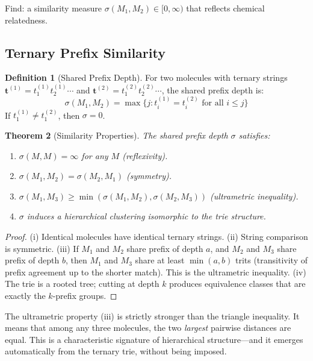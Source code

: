 \documentclass[11pt,twocolumn,a4paper]{article}
\newtheorem{theorem}{Theorem}[section]
\theoremstyle{definition}
\newtheorem{definition}[theorem]{Definition}
\theoremstyle{remark}
\begin{document}
Find: a similarity measure $\sigma(M_1, M_2) \in [0, \infty)$ that reflects chemical relatedness.

\subsection{Ternary Prefix Similarity}

\begin{definition}[Shared Prefix Depth]
\label{def:spd}
For two molecules with ternary strings $\mathbf{t}^{(1)} = t_1^{(1)} t_2^{(1)} \cdots$ and $\mathbf{t}^{(2)} = t_1^{(2)} t_2^{(2)} \cdots$, the shared prefix depth is:
\begin{equation}
\sigma(M_1, M_2) = \max\{j : t_i^{(1)} = t_i^{(2)} \text{ for all } i \leq j\}
\label{eq:spd}
\end{equation}
If $t_1^{(1)} \neq t_1^{(2)}$, then $\sigma = 0$.
\end{definition}

\begin{theorem}[Similarity Properties]
\label{thm:similarity_props}
The shared prefix depth $\sigma$ satisfies:
\begin{enumerate}[nosep]
\item[(i)] $\sigma(M, M) = \infty$ for any $M$ (reflexivity).
\item[(ii)] $\sigma(M_1, M_2) = \sigma(M_2, M_1)$ (symmetry).
\item[(iii)] $\sigma(M_1, M_3) \geq \min(\sigma(M_1, M_2), \sigma(M_2, M_3))$ (ultrametric inequality).
\item[(iv)] $\sigma$ induces a hierarchical clustering isomorphic to the trie structure.
\end{enumerate}
\end{theorem}

\begin{proof}
(i) Identical molecules have identical ternary strings. (ii) String comparison is symmetric. (iii) If $M_1$ and $M_2$ share prefix of depth $a$, and $M_2$ and $M_3$ share prefix of depth $b$, then $M_1$ and $M_3$ share at least $\min(a,b)$ trits (transitivity of prefix agreement up to the shorter match). This is the ultrametric inequality. (iv) The trie is a rooted tree; cutting at depth $k$ produces equivalence classes that are exactly the $k$-prefix groups.
\end{proof}

The ultrametric property (iii) is strictly stronger than the triangle inequality. It means that among any three molecules, the two \emph{largest} pairwise distances are equal. This is a characteristic signature of hierarchical structure---and it emerges automatically from the ternary trie, without being imposed.
\end{document}
